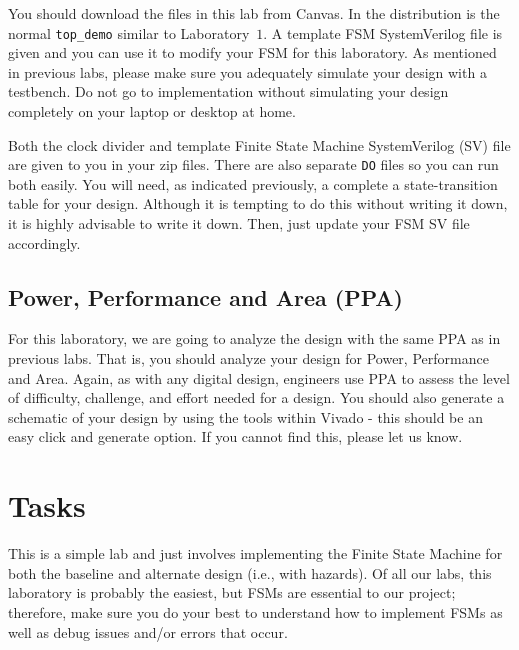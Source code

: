 \documentclass{article}
\begin{document}
You should download the files in this lab from Canvas.  In the
distribution is the normal \verb!top_demo! similar to Laboratory~$1$.
A template FSM SystemVerilog file is given and you can use it to
modify your FSM for this laboratory.  As mentioned in previous labs,
please make sure you adequately simulate your design with a
testbench.  Do not go to implementation without simulating your design
completely on your laptop or desktop at home.

Both the clock divider and template Finite
State Machine SystemVerilog (SV)
file are given to you in your zip files.  There are also separate
\verb!DO! files so you can run both easily.  You will need, as
indicated previously, a complete a state-transition table for your
design.  Although it is tempting to do this without writing it down,
it is highly advisable to write it down.
Then, just update your FSM SV file accordingly.

\subsection{Power, Performance and Area (PPA)}

For this laboratory, we are going to analyze the design with the same
PPA as in previous labs.  That is, you should analyze your design for
Power, Performance
and Area.  Again, as with
any digital design, engineers use PPA to assess the level of
difficulty, challenge, and effort needed for a design.  You should
also generate a schematic of your design by using the tools within
Vivado - this should be an easy click and generate option.  If you
cannot find this, please let us know.

\section{Tasks}

This is a simple lab and just involves implementing the Finite State
Machine for both the baseline and alternate design (i.e., with
hazards).  Of all our labs, this laboratory is probably the easiest,
but FSMs are essential to our project;  therefore, make sure you do
your best to understand how to implement FSMs as well as debug issues
and/or errors that occur.
\end{document}
